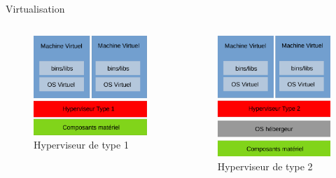\documentclass[11pt]{beamer}
\begin{document}
\begin{frame}{Virtualisation}
\begin{columns}
    \begin{column}{0.48\textwidth}
        \begin{figure}
			\includegraphics[scale=0.30]{images/type1.png}
			\caption{Hyperviseur de type 1}
		\end{figure}
    \end{column}
    \begin{column}{0.48\textwidth}
        \begin{figure}
			\includegraphics[scale=0.25]{images/type2.png}
			\caption{Hyperviseur de type 2}
		\end{figure}
    \end{column}
\end{columns}

\end{frame}
\end{document}
